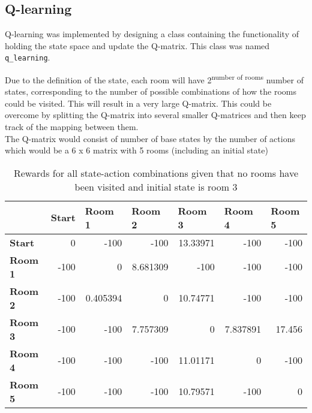 \documentclass[../Head/Main.tex]{subfiles}
\begin{document}
\subsection{Q-learning}
Q-learning was implemented by designing a class containing the functionality of holding the state space and update the Q-matrix. This class was named \texttt{q\_learning}.\par 
Due to the definition of the state, each room will have 2\textsuperscript{number of rooms} number of states, corresponding to the number of possible combinations of how the rooms could be visited. This will result in a very large Q-matrix. 
This could be overcome by splitting the Q-matrix into several smaller Q-matrices and then keep track of the mapping between them.\\
The Q-matrix would consist of number of base states by the number of actions which would be a 6 x 6 matrix with 5 rooms (including an initial state)


\begin{table}[H]
	\centering
	\begin{tabular}{|l|r|r|r|r|r|r|}
	\hline
     & \multicolumn{1}{l|}{\textbf{Start}} & \multicolumn{1}{l|}{\textbf{Room 1}} & \multicolumn{1}{l|}{\textbf{Room 2}} & \multicolumn{1}{l|}{\textbf{Room 3}} & \multicolumn{1}{l|}{\textbf{Room 4}} & \multicolumn{1}{l|}{\textbf{Room 5}} \\ \hline
\textbf{Start}  & 0                                   & {\color{red} -100}          & {\color{red} -100}          & 13.33971                             & {\color{red} -100}          & {\color{red} -100}          \\ \hline
\textbf{Room 1} & {\color{red} -100}         & 0                                    & 8.681309                             & {\color{red} -100}          & {\color{red} -100}          & {\color{red} -100}          \\ \hline
\textbf{Room 2} & {\color{red} -100}         & 0.405394                             & 0                                    & 10.74771                             & {\color{red} -100}          & {\color{red} -100}          \\ \hline
\textbf{Room 3} & {\color{red} -100}         & {\color{red} -100}          & 7.757309                             & 0                                    & 7.837891                             & 17.456                               \\ \hline
\textbf{Room 4} & {\color{red} -100}         & {\color{red} -100}          & {\color{red} -100}          & 11.01171                             & 0                                    & {\color{red} -100}          \\ \hline
\textbf{Room 5} & {\color{red} -100}         & {\color{red} -100}          & {\color{red} -100}          & 10.79571                             & {\color{red} -100}          & 0                                    \\ \hline
	\end{tabular}
	\caption{Rewards for all state-action combinations given that no rooms have been visited and initial state is room 3}
	\label{tab:reward_matrix_5_room}
\end{table}
\end{document}
